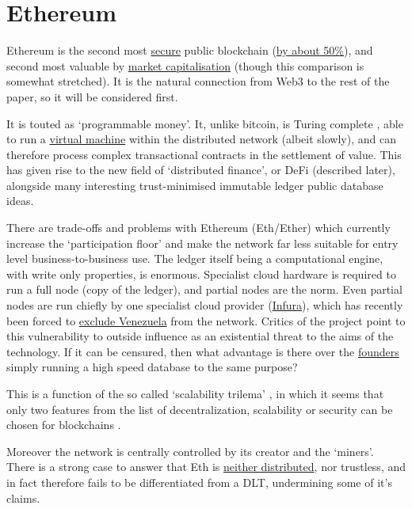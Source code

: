 \section{Ethereum}
Ethereum \cite{buterin2013ethereum} is the second most \href{https://www.crypto51.app/}{secure} public blockchain (\href{https://howmanyconfs.com/}{by about 50\%})\cite{sayeed2019assessing}, and second most valuable by \href{https://coinmarketcap.com/}{market capitalisation} (though this comparison is somewhat stretched). It is the natural connection from Web3 to the rest of the paper, so it will be considered first.\par
It is touted as `programmable money'. It, unlike bitcoin, is Turing complete \cite{petzold2008annotated}, able to run a \href{https://ethereum.org/en/developers/docs/evm/}{virtual machine} within the distributed network (albeit slowly), and can therefore process complex transactional contracts in the settlement of value. This has given rise to the new field of `distributed finance', or DeFi (described later), alongside many interesting trust-minimised immutable ledger public database ideas. \par
There are trade-offs and problems with Ethereum (Eth/Ether) which currently increase the `participation floor' and make the network far less suitable for entry level business-to-business use. The ledger itself being a computational engine, with write only properties, is enormous. Specialist cloud hardware is required to run a full node (copy of the ledger), and partial nodes are the norm. Even partial nodes are run chiefly by one specialist cloud provider (\href{https://consensys.net/blog/news/why-infura-is-the-secret-weapon-of-ethereum-infrastructure/}{Infura}), which has recently been forced to \href{https://finance.yahoo.com/news/metamask-infura-block-certain-areas-173749914.html}{exclude Venezuela} from the network. Critics of the project point to this vulnerability to outside influence as an existential threat to the aims of the technology. If it can be censured, then what advantage is there over the \href{https://protos.com/consensys-lawsuit-jpmorgan-owns-critical-ethereum-infrastructure/}{founders} simply running a high speed database to the same purpose? \par
This is a function of the so called `scalability trilema' \cite{hafid2020scaling}, in which it seems that only two features from the list of decentralization, scalability or security can be chosen for blockchains \cite{bonneau2015sok}.\par
Moreover the network is centrally controlled by its creator and the `miners'. There is a strong case to answer that Eth is \href{https://blog.mollywhite.net/blockchains-are-not-what-they-say/}{neither distributed}, nor trustless, and in fact therefore fails to be differentiated from a DLT, undermining some of it's claims.\par
